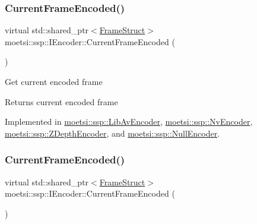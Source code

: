 \subsubsection{\texorpdfstring{Current\+Frame\+Encoded()}{CurrentFrameEncoded()}\hspace{0.1cm}{\footnotesize\ttfamily [1/2]}}
{\footnotesize\ttfamily virtual std\+::shared\+\_\+ptr$<$\hyperlink{structmoetsi_1_1ssp_1_1FrameStruct}{Frame\+Struct}$>$ moetsi\+::ssp\+::\+I\+Encoder\+::\+Current\+Frame\+Encoded (\begin{DoxyParamCaption}{ }\end{DoxyParamCaption})\hspace{0.3cm}{\ttfamily [pure virtual]}}

Get current encoded frame \begin{DoxyReturn}{Returns}
current encoded frame 
\end{DoxyReturn}


Implemented in \hyperlink{classmoetsi_1_1ssp_1_1LibAvEncoder_aedb37703d73b55f1389a122d2ecbe923}{moetsi\+::ssp\+::\+Lib\+Av\+Encoder}, \hyperlink{classmoetsi_1_1ssp_1_1NvEncoder_adbc7d498e797af8c5bb31b5a2a82efdd}{moetsi\+::ssp\+::\+Nv\+Encoder}, \hyperlink{classmoetsi_1_1ssp_1_1ZDepthEncoder_a075752f62bbc40f71026812c5548ef5f}{moetsi\+::ssp\+::\+Z\+Depth\+Encoder}, and \hyperlink{classmoetsi_1_1ssp_1_1NullEncoder_ae48926f99c368849ee8822aed10ac1b5}{moetsi\+::ssp\+::\+Null\+Encoder}.

\mbox{\label{classmoetsi_1_1ssp_1_1IEncoder_a178d117518e7c7007414ea9c82bd3ed6}} 
\subsubsection{\texorpdfstring{Current\+Frame\+Encoded()}{CurrentFrameEncoded()}\hspace{0.1cm}{\footnotesize\ttfamily [2/2]}}
{\footnotesize\ttfamily virtual std\+::shared\+\_\+ptr$<$\hyperlink{structmoetsi_1_1ssp_1_1FrameStruct}{Frame\+Struct}$>$ moetsi\+::ssp\+::\+I\+Encoder\+::\+Current\+Frame\+Encoded (\begin{DoxyParamCaption}{ }\end{DoxyParamCaption})\hspace{0.3cm}{\ttfamily [pure virtual]}}

